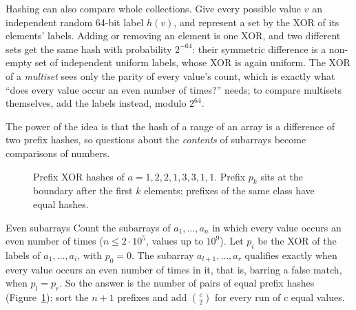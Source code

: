 Hashing can also compare whole collections. Give every possible value $v$ an independent random 64-bit label $h(v)$, and represent a
set by the XOR of its elements' labels. Adding or removing an element is one XOR, and two different sets get the same hash with
probability $2^{-64}$: their symmetric difference is a non-empty set of independent uniform labels, whose XOR is again uniform. The
XOR of a \emph{multiset} sees only the parity of every value's count, which is exactly what ``does every value occur an even number
of times?'' needs; to compare multisets themselves, add the labels instead, modulo $2^{64}$.

The power of the idea is that the hash of a range of an array is a difference of two prefix hashes, so questions about the
\emph{contents} of subarrays become comparisons of numbers.

\begin{figure}[htbp]
\centering
{}
\caption{Prefix XOR hashes of $a = 1, 2, 2, 1, 3, 3, 1, 1$. Prefix $p_k$ sits at the boundary after the first $k$ elements; prefixes
of the same class have equal hashes.}
\label{fig:xorhash}
\end{figure}

\begin{problem}{Even subarrays}
Count the subarrays of $a_1, \dots, a_n$ in which every value occurs an even number of times ($n \le 2 \cdot 10^5$, values up to
$10^9$).
\solution Let $p_i$ be the XOR of the labels of $a_1, \dots, a_i$, with $p_0 = 0$. The subarray $a_{l+1}, \dots, a_r$ qualifies
exactly when every value occurs an even number of times in it, that is, barring a false match, when $p_l = p_r$. So the answer is the
number of pairs of equal prefix hashes (Figure~\ref{fig:xorhash}): sort the $n + 1$ prefixes and add $\binom{c}{2}$ for every run of
$c$ equal values.
\end{problem}

